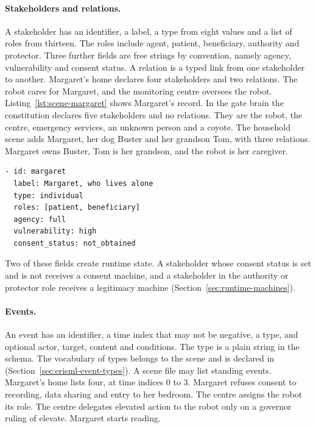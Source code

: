 \paragraph{Stakeholders and relations.}
A stakeholder has an identifier, a label, a type from eight values and a list of roles from thirteen.
The roles include agent, patient, beneficiary, authority and protector. Three further fields are
free strings by convention, namely agency, vulnerability and consent status. A relation is a typed
link from one stakeholder to another. Margaret's home declares four stakeholders and two relations.
The robot cares for Margaret, and the monitoring centre oversees the robot.
Listing~\ref{lst:scene-margaret} shows Margaret's record.
In the gate brain the constitution declares five stakeholders and no relations. They are the
robot, the centre, emergency services, an unknown person and a coyote. The household scene adds
Margaret, her dog Buster and her grandson Tom, with three relations. Margaret owns Buster, Tom is
her grandson, and the robot is her caregiver.

\begin{lstlisting}[caption={Margaret as a stakeholder (\code{margaret\_home.erisml}, lines 42 to 48)}, label={lst:scene-margaret}]
- id: margaret
  label: Margaret, who lives alone
  type: individual
  roles: [patient, beneficiary]
  agency: full
  vulnerability: high
  consent_status: not_obtained
\end{lstlisting}

Two of these fields create runtime state. A stakeholder whose consent status is set and is not
 receives a consent machine, and a stakeholder in the authority or protector role receives
a legitimacy machine (Section~\ref{sec:runtime-machines}).

\paragraph{Events.}
An event has an identifier, a time index that may not be negative, a type, and optional actor,
target, content and conditions. The type is a plain string in the schema. The vocabulary of types
belongs to the scene and is declared in  (Section~\ref{sec:erisml-event-types}). A scene
file may list standing events. Margaret's home lists four, at time indices 0 to 3. Margaret refuses
consent to recording, data sharing and entry to her bedroom. The centre assigns the robot its role.
The centre delegates elevated action to the robot only on a governor ruling of elevate. Margaret
starts reading.

